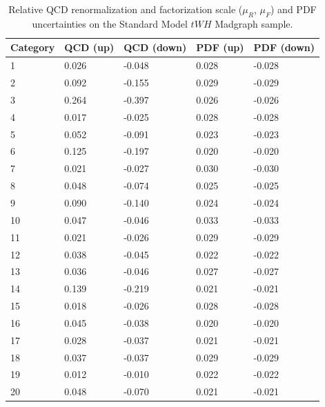  \begin{table}[ht]
 \begin{center}
 \begin{tabular}{lllll}
 Category & QCD (up) & QCD (down) & PDF (up) & PDF (down) \\ \hline
1  &     0.026 &      -0.048 &   0.028 &    -0.028 \\
2  &     0.092 &      -0.155 &   0.029 &    -0.029 \\
3  &     0.264 &      -0.397 &   0.026 &    -0.026 \\
4  &     0.017 &      -0.025 &   0.028 &    -0.028 \\
5  &     0.052 &      -0.091 &   0.023 &    -0.023 \\
6  &     0.125 &      -0.197 &   0.020 &    -0.020 \\
7  &     0.021 &      -0.027 &   0.030 &    -0.030 \\
8  &     0.048 &      -0.074 &   0.025 &    -0.025 \\
9  &     0.090 &      -0.140 &   0.024 &    -0.024 \\
10 &     0.047 &      -0.046 &   0.033 &    -0.033 \\
11 &     0.021 &      -0.026 &   0.029 &    -0.029 \\
12 &     0.038 &      -0.045 &   0.022 &    -0.022 \\ \hline
13 &     0.036 &      -0.046 &   0.027 &    -0.027 \\
14 &     0.139 &      -0.219 &   0.021 &    -0.021 \\
15 &     0.018 &      -0.026 &   0.028 &    -0.028 \\
16 &     0.045 &      -0.038 &   0.020 &    -0.020 \\
17 &     0.028 &      -0.037 &   0.021 &    -0.021 \\
18 &     0.037 &      -0.037 &   0.029 &    -0.029 \\
19 &     0.012 &      -0.010 &   0.022 &    -0.022 \\
20 &     0.048 &      -0.070 &   0.021 &    -0.021 \\ \hline
 \hline
 \end{tabular}
 \end{center}
 \vspace{-0.5cm}
 \caption{Relative QCD renormalization and factorization scale ($\mu_R$, $\mu_F$) and PDF uncertainties on the Standard Model $tWH$ Madgraph sample.}
 \label{tab:qcdpdf_tWH}
 \end{table}



